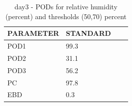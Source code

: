 \begin{table}[p!]
\begin{center}
\begin{tabular}{|l|l|l|l|}
\hline
\multicolumn{1}{|c|}{\cellcolor[HTML]{C0C0C0}\textbf{PARAMETER}} & \multicolumn{1}{c|}{\cellcolor[HTML]{C0C0C0}\textbf{STANDARD}}  \\
\hline
\cellcolor[HTML]{C0C0C0}POD1  & 99.3                                \\
\cellcolor[HTML]{C0C0C0}POD2  & 31.1                                \\
\cellcolor[HTML]{C0C0C0}POD3  & 56.2                                \\
\cellcolor[HTML]{C0C0C0}PC    & 97.8                                \\
\cellcolor[HTML]{C0C0C0}EBD   & 0.3                                \\
\hline
\end{tabular}
\caption{day3 - PODs for relative humidity (percent) and thresholds (50,70) percent}
\label{tab:podrhFT:day3}
\end{center}
\end{table}
